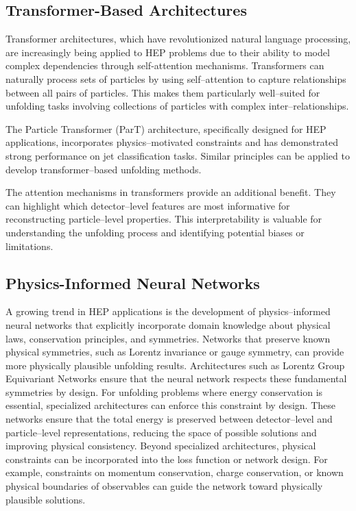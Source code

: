\subsection{Transformer-Based Architectures}
    Transformer architectures, which have revolutionized natural language processing, are increasingly being applied to HEP problems due to their ability to model complex dependencies through self-attention mechanisms.\kd{}
    Transformers can naturally process sets of particles by using self--attention to capture relationships between all pairs of particles.
    This makes them particularly well--suited for unfolding tasks involving collections of particles with complex inter--relationships.

    The Particle Transformer (ParT) architecture,\kd{} specifically designed for HEP applications, incorporates physics--motivated constraints and has demonstrated strong performance on jet classification tasks.\kd{}
    Similar principles can be applied to develop transformer--based unfolding methods.

    The attention mechanisms in transformers provide an additional benefit.
    They can highlight which detector--level features are most informative for reconstructing particle--level properties.
    This interpretability is valuable for understanding the unfolding process and identifying potential biases or limitations.
\subsection{Physics-Informed Neural Networks}
    A growing trend in HEP applications is the development of physics--informed neural networks that explicitly incorporate domain knowledge about physical laws, conservation principles, and symmetries.
    Networks that preserve known physical symmetries, such as Lorentz invariance or gauge symmetry, can provide more physically plausible unfolding results.
    Architectures such as Lorentz Group Equivariant Networks\kd{} ensure that the neural network respects these fundamental symmetries by design.
    For unfolding problems where energy conservation is essential, specialized architectures can enforce this constraint by design.
    These networks ensure that the total energy is preserved between detector--level and particle--level representations, reducing the space of possible solutions and improving physical consistency.
    Beyond specialized architectures, physical constraints can be incorporated into the loss function or network design.
    For example, constraints on momentum conservation, charge conservation, or known physical boundaries of observables can guide the network toward physically plausible solutions.
